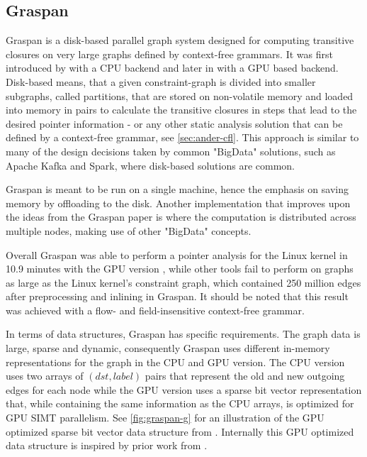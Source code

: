 \subsection{Graspan}\label{sec:graspan}
Graspan is a disk-based parallel graph system designed for computing transitive closures on very large graphs defined by context-free grammars. It was first introduced by \cite{wang2017graspan} with a CPU backend and later in \cite{zuo2021systemizing} with a GPU based backend.
Disk-based means, that a given constraint-graph is divided into smaller subgraphs, called partitions, that are stored on non-volatile memory and loaded into memory in pairs to calculate the transitive closures in steps that lead to the desired pointer information - or any other static analysis solution that can be defined by a context-free grammar, see \autoref{sec:ander-cfl}.
This approach is similar to many of the design decisions taken by common "BigData" solutions, such as Apache Kafka and Spark, where disk-based solutions are common.

Graspan is meant to be run on a single machine, hence the emphasis on saving memory by offloading to the disk. Another implementation that improves upon the ideas from the Graspan paper is \cite{gu2020towards} where the computation is distributed across multiple nodes, making use of other "BigData" concepts.

Overall Graspan was able to perform a pointer analysis for the Linux kernel in 10.9 minutes with the GPU version \cite{zuo2021systemizing}, while other tools fail to perform on graphs as large as the Linux kernel's constraint graph, which contained 250 million edges after preprocessing and inlining in Graspan. It should be noted that this result was achieved with a flow- and field-insensitive context-free grammar.

In terms of data structures, Graspan has specific requirements. The graph data is large, sparse and dynamic, consequently Graspan uses different in-memory representations for the graph in the CPU and GPU version. The CPU version uses two arrays of $(dst,label)$ pairs that represent the old and new outgoing edges for each node while the GPU version uses a sparse bit vector representation that, while containing the same information as the CPU arrays, is optimized for GPU SIMT parallelism. See \autoref{fig:graspan-g} for an illustration of the GPU optimized sparse bit vector data structure from \cite{zuo2021systemizing}. Internally this GPU optimized data structure is inspired by prior work from \cite{mendez2012gpu}.

